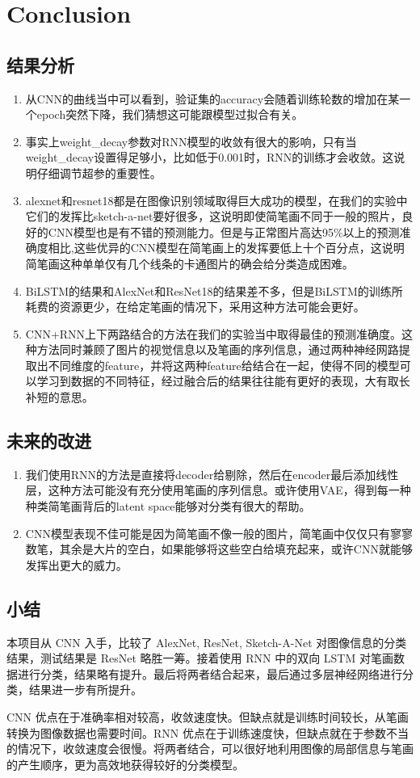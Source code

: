 \section{Conclusion}


\subsection{结果分析}

\begin{enumerate}
    \item 从CNN的曲线当中可以看到，验证集的accuracy会随着训练轮数的增加在某一个epoch突然下降，我们猜想这可能跟模型过拟合有关。
    \item 事实上weight\_decay参数对RNN模型的收敛有很大的影响，只有当weight\_decay设置得足够小，比如低于0.001时，RNN的训练才会收敛。这说明仔细调节超参的重要性。
    \item alexnet和resnet18都是在图像识别领域取得巨大成功的模型，在我们的实验中它们的发挥比sketch-a-net要好很多，这说明即使简笔画不同于一般的照片，良好的CNN模型也是有不错的预测能力。但是与正常图片高达95\%以上的预测准确度相比,这些优异的CNN模型在简笔画上的发挥要低上十个百分点，这说明简笔画这种单单仅有几个线条的卡通图片的确会给分类造成困难。
    \item BiLSTM的结果和AlexNet和ResNet18的结果差不多，但是BiLSTM的训练所耗费的资源更少，在给定笔画的情况下，采用这种方法可能会更好。
    \item CNN+RNN上下两路结合的方法在我们的实验当中取得最佳的预测准确度。这种方法同时兼顾了图片的视觉信息以及笔画的序列信息，通过两种神经网路提取出不同维度的feature，并将这两种feature给结合在一起，使得不同的模型可以学习到数据的不同特征，经过融合后的结果往往能有更好的表现，大有取长补短的意思。
\end{enumerate}
\subsection{未来的改进}
\begin{enumerate}
    \item 我们使用RNN的方法是直接将decoder给剔除，然后在encoder最后添加线性层，这种方法可能没有充分使用笔画的序列信息。或许使用VAE，得到每一种种类简笔画背后的latent space能够对分类有很大的帮助。
    \item CNN模型表现不佳可能是因为简笔画不像一般的图片，简笔画中仅仅只有寥寥数笔，其余是大片的空白，如果能够将这些空白给填充起来，或许CNN就能够发挥出更大的威力。
\end{enumerate}

\subsection{小结}

本项目从 CNN 入手，比较了 AlexNet, ResNet, Sketch-A-Net 对图像信息的分类结果，测试结果是 ResNet 略胜一筹。接着使用 RNN 中的双向 LSTM 对笔画数据进行分类，结果略有提升。最后将两者结合起来，最后通过多层神经网络进行分类，结果进一步有所提升。

CNN 优点在于准确率相对较高，收敛速度快。但缺点就是训练时间较长，从笔画转换为图像数据也需要时间。RNN 优点在于训练速度快，但缺点就在于参数不当的情况下，收敛速度会很慢。将两者结合，可以很好地利用图像的局部信息与笔画的产生顺序，更为高效地获得较好的分类模型。
